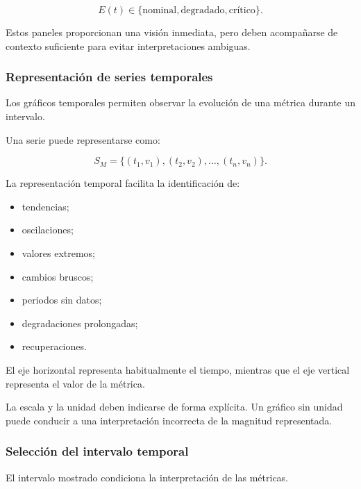 \[
    E(t)
    \in
    \{
        \text{nominal},
        \text{degradado},
        \text{crítico}
    \}.
\]

Estos paneles proporcionan una visión inmediata, pero deben acompañarse
de contexto suficiente para evitar interpretaciones ambiguas.


\subsubsection*{Representación de series temporales}

Los gráficos temporales permiten observar la evolución de una métrica
durante un intervalo.

Una serie puede representarse como:

\[
    S_M
    =
    \{
        (t_1,v_1),
        (t_2,v_2),
        \ldots,
        (t_n,v_n)
    \}.
\]

La representación temporal facilita la identificación de:

\begin{itemize}
    \item tendencias;

    \item oscilaciones;

    \item valores extremos;

    \item cambios bruscos;

    \item periodos sin datos;

    \item degradaciones prolongadas;

    \item recuperaciones.
\end{itemize}

El eje horizontal representa habitualmente el tiempo, mientras que el
eje vertical representa el valor de la métrica.

La escala y la unidad deben indicarse de forma explícita. Un gráfico sin
unidad puede conducir a una interpretación incorrecta de la magnitud
representada.


\subsubsection*{Selección del intervalo temporal}

El intervalo mostrado condiciona la interpretación de las métricas.

